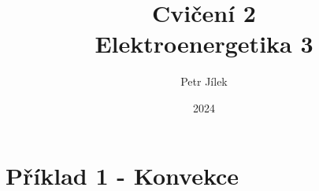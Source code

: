 \documentclass{article}
\title{\textbf{Cvičení 2}\\Elektroenergetika 3}
\author{Petr Jílek}
\date{2024}
\begin{document}



\maketitle



\section*{Příklad 1 - Konvekce}
\end{document}
